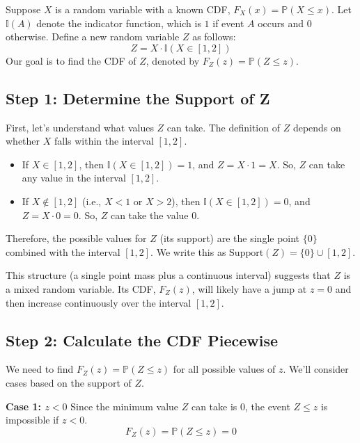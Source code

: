 \documentclass[11pt]{article}
\theoremstyle{definition}
\theoremstyle{remark}
\newcommand{\Prob}{\mathbb{P}}
\begin{document}
Suppose $X$ is a random variable with a known CDF, $F_X(x) = \Prob(X \leq x)$. Let $\mathbb{I}(A)$ denote the indicator function, which is $1$ if event $A$ occurs and $0$ otherwise.
Define a new random variable $Z$ as follows:
\[ Z = X \cdot \mathbb{I}(X \in [1, 2]) \]
Our goal is to find the CDF of $Z$, denoted by $F_Z(z) = \Prob(Z \leq z)$.

\subsection{Step 1: Determine the Support of Z}

First, let's understand what values $Z$ can take. The definition of $Z$ depends on whether $X$ falls within the interval $[1, 2]$.
\begin{itemize}
    \item If $X \in [1, 2]$, then $\mathbb{I}(X \in [1, 2]) = 1$, and $Z = X \cdot 1 = X$. So, $Z$ can take any value in the interval $[1, 2]$.
    \item If $X \notin [1, 2]$ (i.e., $X < 1$ or $X > 2$), then $\mathbb{I}(X \in [1, 2]) = 0$, and $Z = X \cdot 0 = 0$. So, $Z$ can take the value $0$.
\end{itemize}
Therefore, the possible values for $Z$ (its support) are the single point $\{0\}$ combined with the interval $[1, 2]$. We write this as $\text{Support}(Z) = \{0\} \cup [1, 2]$.

This structure (a single point mass plus a continuous interval) suggests that $Z$ is a mixed random variable. Its CDF, $F_Z(z)$, will likely have a jump at $z=0$ and then increase continuously over the interval $[1, 2]$.

\subsection{Step 2: Calculate the CDF Piecewise}

We need to find $F_Z(z) = \Prob(Z \leq z)$ for all possible values of $z$. We'll consider cases based on the support of $Z$.

\textbf{Case 1: $z < 0$}
Since the minimum value $Z$ can take is $0$, the event $Z \leq z$ is impossible if $z < 0$.
\[ F_Z(z) = \Prob(Z \leq z) = 0 \]
\end{document}

